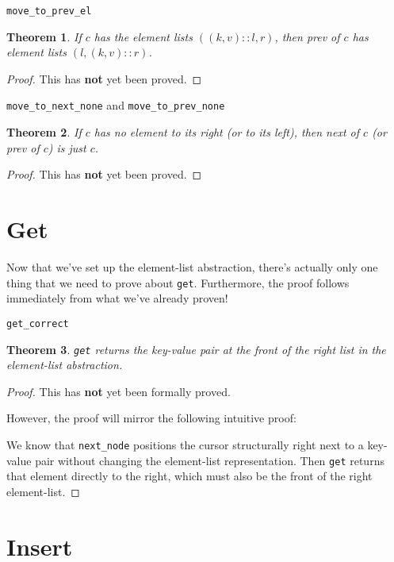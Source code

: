 \documentclass[12pt]{article}
\newtheorem{theorem}{Theorem}
\begin{document}
\bigskip
\texttt{move\_to\_prev\_el}

\begin{theorem}
If $c$ has the element lists $((k,v)::l,r)$, then prev of $c$ has element lists $(l,(k,v)::r)$.
\end{theorem}

\begin{proof}
This has \textbf{not} yet been proved.
\end{proof}

\bigskip
\texttt{move\_to\_next\_none} and \texttt{move\_to\_prev\_none}

\begin{theorem}
If $c$ has no element to its right (or to its left), then next of $c$ (or prev of $c$) is just $c$.
\end{theorem}

\begin{proof}
This has \textbf{not} yet been proved.
\end{proof}

\section{Get}

Now that we've set up the element-list abstraction, there's actually only one thing that we need to prove about \texttt{get}. Furthermore, the proof follows immediately from what we've already proven!

\bigskip
\texttt{get\_correct}

\begin{theorem}
\texttt{get} returns the key-value pair at the front of the right list in the element-list abstraction.
\end{theorem}

\begin{proof}
This has \textbf{not} yet been formally proved.

However, the proof will mirror the following intuitive proof:

We know that \texttt{next\_node} positions the cursor structurally right next to a key-value pair without changing the element-list representation. Then \texttt{get} returns that element directly to the right, which must also be the front of the right element-list.
\end{proof}

\section{Insert}
\end{document}
